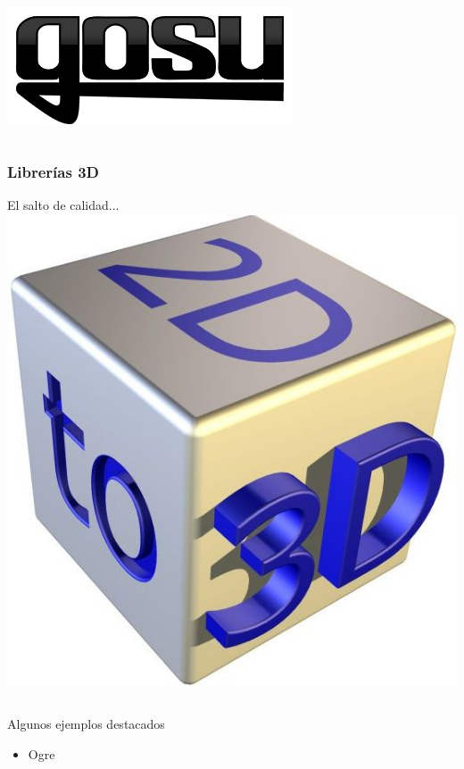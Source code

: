 \begin{frame}
\begin{columns}[c]
\begin{center}
			\newline
			\includegraphics[scale=0.23]{img/gosu.png}
		\end{center}
	\end{columns} 

\end{frame}


\begin{frame}
	\frametitle{Librerías 3D}
	El salto de calidad... 			\hspace{5.5cm}\includegraphics[scale=0.12]{img/2dto3d.jpg}
	\newline
	\begin{columns}[c]
		\column{150pt}
		\begin{block}{Algunos ejemplos destacados}
            \begin{itemize}
							\item Ogre

\end{itemize}
\end{block}
\end{columns}
\end{frame}
